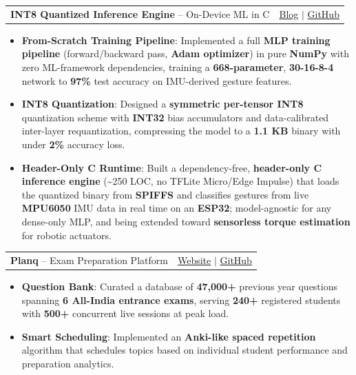 \documentclass[letterpaper,11pt]{article}
\makeatletter
\newcommand{\resumeItem}[2]{
  \item\small{
    \textbf{#1}{: #2 \vspace{-2pt}}
  }
}
\newcommand{\resumeProjectHeading}[2]{
    \item
    \begin{tabular*}{0.97\textwidth}{l@{\extracolsep{\fill}}r}
      \small#1 & #2 \\
    \end{tabular*}\vspace{-7pt}
}
\newcommand{\resumeItemListStart}{\begin{itemize}}
\newcommand{\resumeItemListEnd}{\end{itemize}\vspace{-5pt}}
\makeatother
\begin{document}
    \resumeProjectHeading
      {\textbf{INT8 Quantized Inference Engine} -- On-Device ML in C}{\href{https://blogs.natya.dev/esp-infer/}{Blog} $|$ \href{https://github.com/natyavidhan/esp-infer}{GitHub}}
      \resumeItemListStart
        \resumeItem{From-Scratch Training Pipeline}
          {Implemented a full \textbf{MLP training pipeline} (forward/backward pass, \textbf{Adam optimizer}) in pure \textbf{NumPy} with zero ML-framework dependencies, training a \textbf{668-parameter}, \textbf{30-16-8-4} network to \textbf{97\%} test accuracy on IMU-derived gesture features.}
        \resumeItem{INT8 Quantization}
          {Designed a \textbf{symmetric per-tensor INT8} quantization scheme with \textbf{INT32} bias accumulators and data-calibrated inter-layer requantization, compressing the model to a \textbf{1.1 KB} binary with under \textbf{2\%} accuracy loss.}
        \resumeItem{Header-Only C Runtime}
          {Built a dependency-free, \textbf{header-only C inference engine} (\textasciitilde250 LOC, no TFLite Micro/Edge Impulse) that loads the quantized binary from \textbf{SPIFFS} and classifies gestures from live \textbf{MPU6050} IMU data in real time on an \textbf{ESP32}; model-agnostic for any dense-only MLP, and being extended toward \textbf{sensorless torque estimation} for robotic actuators.}
      \resumeItemListEnd


    \resumeProjectHeading
      {\textbf{Planq} -- Exam Preparation Platform}{\href{https://planq.in}{Website} $|$ \href{https://github.com/planq-org/}{GitHub}}
      \resumeItemListStart
        \resumeItem{Question Bank}
          {Curated a database of \textbf{47,000+} previous year questions spanning \textbf{6 All-India entrance exams}, serving \textbf{240+} registered students with \textbf{500+} concurrent live sessions at peak load.}
        \resumeItem{Smart Scheduling}
          {Implemented an \textbf{Anki-like spaced repetition} algorithm that schedules topics based on individual student performance and preparation analytics.}
      \resumeItemListEnd
\end{document}
